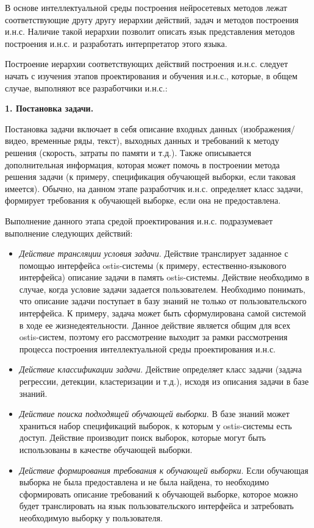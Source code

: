 В основе интеллектуальной среды построения нейросетевых методов лежат соответствующие другу другу иерархии действий, задач и методов построения и.н.с. Наличие такой иерархии позволит описать язык представления методов построения и.н.с. и разработать интерпретатор этого языка.

Построение иерархии соответствующих действий построения и.н.с. следует начать с изучения этапов проектирования и обучения и.н.с., которые, в общем случае, выполняют все разработчики и.н.с.:

\textbf{1. Постановка задачи. }

Постановка задачи включает в себя описание входных данных (изображения/видео, временные ряды, текст), выходных данных и требований к методу решения (скорость, затраты по памяти и т.д.). Также описывается дополнительная информация, которая может помочь в построении метода решения задачи (к примеру, спецификация обучающей выборки, если таковая имеется). Обычно, на данном этапе разработчик и.н.с. определяет класс задачи, формирует требования к обучающей выборке, если она не предоставлена.

Выполнение данного этапа средой проектирования и.н.с. подразумевает выполнение следующих действий:
\begin{itemize}
	\item \textit{Действие трансляции условия задачи}. Действие транслирует заданное с помощью интерфейса ostis-системы (к примеру, естественно-языкового интерфейса) описание задачи в память ostis-системы.  Действие необходимо в случае, когда условие задачи задается пользователем. Необходимо понимать, что описание задачи поступает в базу знаний не только от пользовательского интерфейса. К примеру, задача может быть сформулирована самой системой в ходе ее жизнедеятельности.
	Данное действие является общим для всех ostis-систем, поэтому его рассмотрение выходит за рамки рассмотрения процесса построения интеллектуальной среды проектирования и.н.с.
	\item \textit{Действие классификации задачи}. Действие определяет класс задачи (задача регрессии, детекции, кластеризации и т.д.), исходя из описания задачи в базе знаний.
	\item \textit{Действие поиска подходящей обучающей выборки}. В базе знаний может храниться набор спецификаций выборок, к которым у ostis-системы есть доступ. Действие производит поиск выборок, которые могут быть использованы в качестве обучающей выборки.
	\item \textit{Действие формирования требования к обучающей выборки}. Если обучающая выборка не была предоставлена и не была найдена, то необходимо сформировать описание требований к обучающей выборке, которое можно будет транслировать на язык пользовательского интерфейса и затребовать необходимую выборку у пользователя.
\end{itemize}

